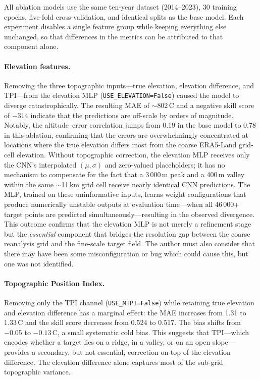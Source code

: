All ablation models use the same ten-year dataset (2014--2023), 30 training epochs, five-fold cross-validation, and identical splits as the base model. Each experiment disables a single feature group while keeping everything else unchanged, so that differences in the metrics can be attributed to that component alone.

\paragraph{Elevation features.}
Removing the three topographic inputs---true elevation, elevation difference, and TPI---from the elevation MLP (\texttt{USE\_ELEVATION=False}) caused the model to diverge catastrophically. The resulting MAE of ${\sim}802$\,\textdegree C and a negative skill score of $-314$ indicate that the predictions are off-scale by orders of magnitude. Notably, the altitude--error correlation jumps from 0.19 in the base model to 0.78 in this ablation, confirming that the errors are overwhelmingly concentrated at locations where the true elevation differs most from the coarse ERA5-Land grid-cell elevation. Without topographic correction, the elevation MLP receives only the CNN's interpolated $(\mu, \sigma)$ and zero-valued placeholders; it has no mechanism to compensate for the fact that a 3\,000\,m peak and a 400\,m valley within the same ${\sim}$11\,km grid cell receive nearly identical CNN predictions. The MLP, trained on these uninformative inputs, learns weight configurations that produce numerically unstable outputs at evaluation time---when all 46\,000+ target points are predicted simultaneously---resulting in the observed divergence. This outcome confirms that the elevation MLP is not merely a refinement stage but the \emph{essential} component that bridges the resolution gap between the coarse reanalysis grid and the fine-scale target field. The author must also consider that there may have been some misconfiguration or bug which could cause this, but one was not identified.

\paragraph{Topographic Position Index.}
Removing only the TPI channel \newline (\texttt{USE\_MTPI=False}) while retaining true elevation and elevation difference has a marginal effect: the MAE increases from 1.31 to 1.33\,\textdegree C and the skill score decreases from 0.524 to 0.517. The bias shifts from $-0.05$ to $-0.13$\,\textdegree C, a small systematic cold bias. This suggests that TPI---which encodes whether a target lies on a ridge, in a valley, or on an open slope---provides a secondary, but not essential, correction on top of the elevation difference. The elevation difference alone captures most of the sub-grid topographic variance.

